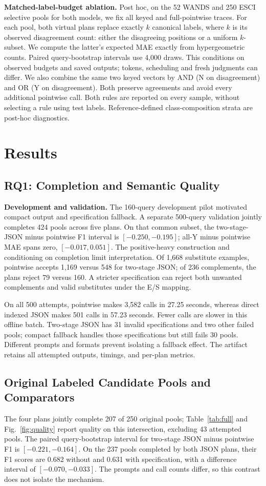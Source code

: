 \documentclass[conference]{IEEEtran}
\begin{document}
\textbf{Matched-label-budget ablation.} Post hoc, on the 52 WANDS and 250 ESCI selective pools for both models, we fix all keyed and full-pointwise traces. For each pool, both virtual plans replace exactly $k$ canonical labels, where $k$ is its observed disagreement count: either the disagreeing positions or a uniform $k$-subset. We compute the latter's expected MAE exactly from hypergeometric counts. Paired query-bootstrap intervals use 4,000 draws. This conditions on observed budgets and saved outputs; tokens, scheduling and fresh judgments can differ. We also combine the same two keyed vectors by AND (N on disagreement) and OR (Y on disagreement). Both preserve agreements and avoid every additional pointwise call. Both rules are reported on every sample, without selecting a rule using test labels. Reference-defined class-composition strata are post-hoc diagnostics.

\section{Results}
\subsection{RQ1: Completion and Semantic Quality}
\textbf{Development and validation.} The 160-query development pilot motivated compact output and specification fallback. A separate 500-query validation jointly completes 424 pools across five plans. On that common subset, the two-stage-JSON minus pointwise F1 interval is $[-0.250,-0.195]$; all-Y minus pointwise MAE spans zero, $[-0.017,0.051]$. The positive-heavy construction and conditioning on completion limit interpretation. Of 1,668 substitute examples, pointwise accepts 1,169 versus 548 for two-stage JSON; of 236 complements, the plans reject 79 versus 160. A stricter specification can reject both unwanted complements and valid substitutes under the E/S mapping.

On all 500 attempts, pointwise makes 3,582 calls in 27.25 seconds, whereas direct indexed JSON makes 501 calls in 57.23 seconds. Fewer calls are slower in this offline batch. Two-stage JSON has 31 invalid specifications and two other failed pools; compact fallback handles those specifications but still fails 30 pools. Different prompts and formats prevent isolating a fallback effect. The artifact retains all attempted outputs, timings, and per-plan metrics.

\subsection{Original Labeled Candidate Pools and Comparators}
The four plans jointly complete 207 of 250 original pools; Table~\ref{tab:full} and Fig.~\ref{fig:quality} report quality on this intersection, excluding 43 attempted pools. The paired query-bootstrap interval for two-stage JSON minus pointwise F1 is $[-0.221,-0.164]$. On the 237 pools completed by both JSON plans, their F1 scores are 0.682 without and 0.631 with specification, with a difference interval of $[-0.070,-0.033]$. The prompts and call counts differ, so this contrast does not isolate the mechanism.
\end{document}
